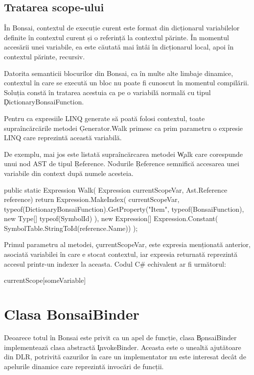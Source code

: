 \documentclass[12pt,a4paper]{memoir}
\begin{document}
\subsection{Tratarea scope-ului} 

În Bonsai, contextul de execuție curent este format din dicționarul variabilelor definite în contextul curent și o referință la contextul părinte. În momentul accesării unei variabile, ea este căutată mai întâi în dicționarul local, apoi în contextul părinte, recursiv.

Datorita semanticii blocurilor din Bonsai, ca în multe alte limbaje dinamice, contextul în care se execută un bloc nu poate fi cunoscut în momentul compilării. Soluția constă în tratarea acestuia ca pe o variabilă normală cu tipul \c{DictionaryBonsaiFunction}. 

Pentru ca expresiile LINQ generate să poată folosi contextul, toate supraîncărcările metodei \c{Generator.Walk} primesc ca prim parametru o expresie LINQ care reprezintă această variabilă.

De exemplu, mai jos este listată supraîncărcarea metodei \c{Walk} care corespunde unui nod AST de tipul \c{Reference}. Nodurile \c{Reference} semnifică accesarea unei variabile din context după numele acesteia. 
\begin{code}
public static Expression Walk(
    Expression currentScopeVar,
    Ast.Reference reference)
{
    return Expression.MakeIndex(
        currentScopeVar,
        typeof(DictionaryBonsaiFunction).GetProperty("Item", 
            typeof(BonsaiFunction), new Type[] { typeof(SymbolId) }), 
        new Expression[] { Expression.Constant(
            SymbolTable.StringToId(reference.Name)) });
}
\end{code}
Primul parametru al metodei, \c{currentScopeVar}, este expresia menționată anterior, asociată variabilei în care e stocat contextul, iar expresia returnată reprezintă accesul printr-un indexer la aceasta. Codul C\# echivalent ar fi următorul:
\begin{code}
currentScope[someVariable]
\end{code}

\section{Clasa BonsaiBinder}

Deoarece totul în Bonsai este privit ca un apel de funcție, clasa \c{BonsaiBinder} implementează clasa abstractă \c{InvokeBinder}. Aceasta este o unealtă ajutătoare din DLR, potrivită cazurilor în care un implementator nu este interesat decât de apelurile dinamice care reprezintă invocări de funcții. 
\end{document}
